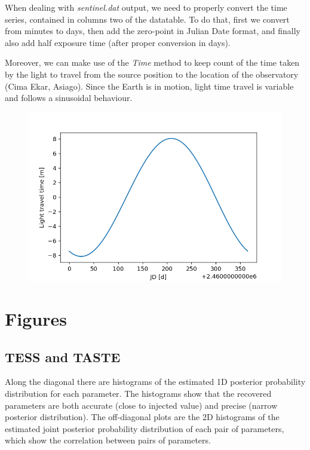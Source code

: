 \documentclass[a4paper,11pt,twocolumn]{article}
\begin{document}
When dealing with \textit{sentinel.dat} output, we need to properly convert the 
time series, contained in columns two of the datatable. To do that, first we
convert from minutes to days, then add the zero-point in Julian Date format, and 
finally also add half exposure time (after proper conversion in days).

Moreover, we can make use of the \textit{Time} method to keep count of the time 
taken by the light to travel from the source position to the location of the 
observatory (Cima Ekar, Asiago). Since the Earth is in motion, light time 
travel is variable and follows a sinusoidal behaviour.
\begin{figure}[H]
    \centering  
    \includegraphics[scale=0.4, angle=0]{../pictures/time_corr.png}
\end{figure}


\section{Figures}




\subsection{TESS and TASTE}
\label{sect:app_C_TT}

Along the diagonal there are histograms of the estimated 1D posterior 
probability distribution for each parameter. 
The histograms show that the recovered parameters are both accurate 
(close to injected value) and precise (narrow posterior distribution). 
The off-diagonal plots are the 2D histograms of the estimated joint 
posterior probability distribution of each pair of parameters, which 
show the correlation between pairs of parameters.
\end{document}
